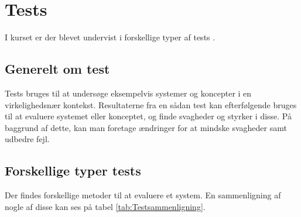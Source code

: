 \chapter{Tests}
I kurset  er der blevet undervist i forskellige typer af tests \citep{DIS}.

\section{Generelt om test}
Tests bruges til at undersøge eksempelvis systemer og koncepter i en virkelighedsnær kontekst. Resultaterne fra en sådan test kan efterfølgende bruges til at evaluere systemet eller konceptet, og finde svagheder og styrker i disse. På baggrund af dette, kan man foretage ændringer for at mindske svagheder samt udbedre fejl. 

\section{Forskellige typer tests}
Der findes forskellige metoder til at evaluere et system. En sammenligning af nogle af disse kan ses på tabel \ref{tab:Testsammenligning}. 

